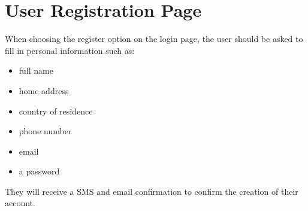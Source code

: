 \documentclass[10pt]{article}
\begin{document}
\section{User Registration Page}
When choosing the register option on the login page, the user should be asked to fill in personal information such as:

\begin{itemize}
  \item full name

  \item home address

  \item country of residence

  \item phone number

  \item email

  \item a password

\end{itemize}

They will receive a SMS and email confirmation to confirm the creation of their account.
\end{document}
